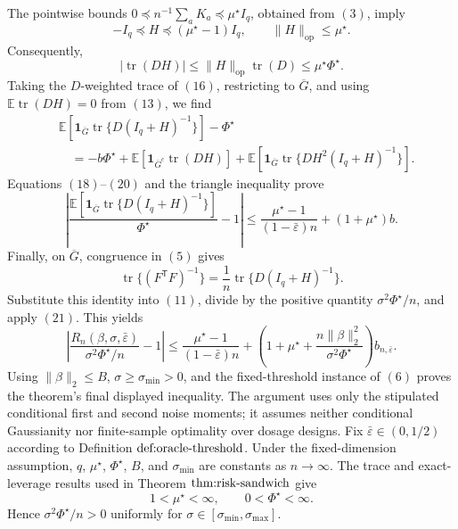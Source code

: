 The pointwise bounds \(0\preceq n^{-1}\sum_aK_a\preceq\mu^\star I_q\), obtained from \((3)\), imply
\[
 -I_q\preceq H\preceq(\mu^\star-1)I_q,
 \qquad
 \|H\|_{\mathrm{op}}\le\mu^\star.
\]
Consequently,
\[
 |\operatorname{tr}(DH)|
 \le\|H\|_{\mathrm{op}}\operatorname{tr}(D)
 \le\mu^\star\Phi^\star.
 \tag{19}
\]
Taking the \(D\)-weighted trace of \((16)\), restricting to \(\overline G\), and using \(\mathbb E\operatorname{tr}(DH)=0\) from \((13)\), we find
\[
\begin{aligned}
 &\mathbb E\!\left[\mathbf 1_{\overline G}
 \operatorname{tr}\{D(I_q+H)^{-1}\}\right]-\Phi^\star\\
 &\quad=-b\Phi^\star
 +\mathbb E\!\left[\mathbf 1_{\overline G^c}\operatorname{tr}(DH)\right]
 +\mathbb E\!\left[\mathbf 1_{\overline G}
 \operatorname{tr}\{DH^2(I_q+H)^{-1}\}\right].
\end{aligned}
 \tag{20}
\]
Equations \((18)\)--\((20)\) and the triangle inequality prove
\[
 \left|
 \frac{\mathbb E[\mathbf 1_{\overline G}
 \operatorname{tr}\{D(I_q+H)^{-1}\}]}{\Phi^\star}-1
 \right|
 \le\frac{\mu^\star-1}{(1-\bar\varepsilon)n}
 +(1+\mu^\star)b.
 \tag{21}
\]
Finally, on \(\overline G\), congruence in \((5)\) gives
\[
 \operatorname{tr}\{(F^{\mathsf T}F)^{-1}\}
 =\frac1n\operatorname{tr}\{D(I_q+H)^{-1}\}.
\]
Substitute this identity into \((11)\), divide by the positive quantity \(\sigma^2\Phi^\star/n\), and apply \((21)\).  This yields
\[
 \left|
 \frac{R_n(\beta,\sigma,\bar\varepsilon)}{\sigma^2\Phi^\star/n}-1
 \right|
 \le\frac{\mu^\star-1}{(1-\bar\varepsilon)n}
 +\left(1+\mu^\star+
 \frac{n\|\beta\|_2^2}{\sigma^2\Phi^\star}\right)b_{n,\bar\varepsilon}.
\]
Using \(\|\beta\|_2\le B\), \(\sigma\ge\sigma_{\min}>0\), and the fixed-threshold instance of \((6)\) proves the theorem's final displayed inequality.  The argument uses only the stipulated conditional first and second noise moments; it assumes neither conditional Gaussianity nor finite-sample optimality over dosage designs.
Fix \(\bar\varepsilon\in(0,1/2)\) according to Definition \(\textnormal{def:oracle-threshold}\).  Under the fixed-dimension assumption, \(q\), \(\mu^\star\), \(\Phi^\star\), \(B\), and \(\sigma_{\min}\) are constants as \(n\to\infty\).  The trace and exact-leverage results used in Theorem \(\textnormal{thm:risk-sandwich}\) give
\[
 1<\mu^\star<\infty,
 \qquad
 0<\Phi^\star<\infty.
\]
Hence \(\sigma^2\Phi^\star/n>0\) uniformly for \(\sigma\in[\sigma_{\min},\sigma_{\max}]\).

